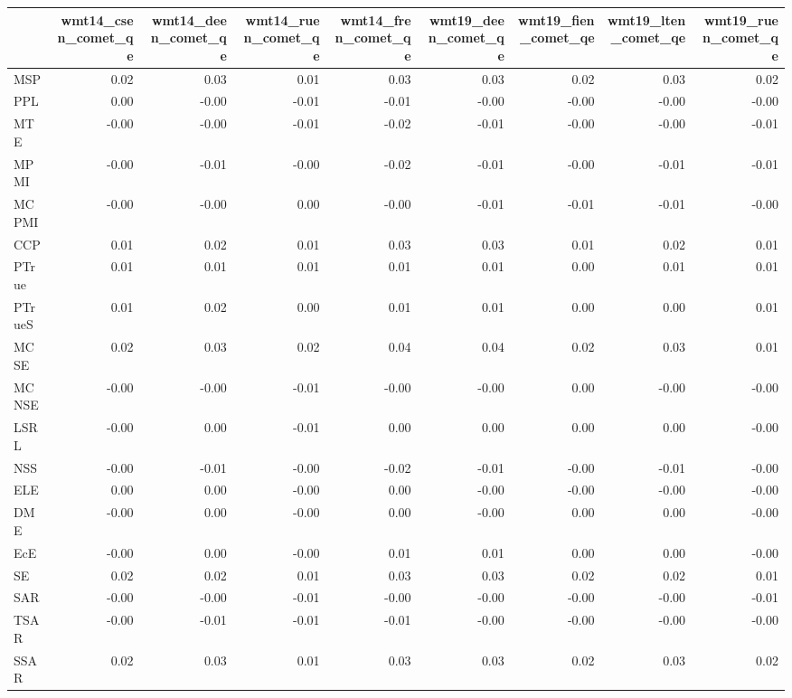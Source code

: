 \begin{tabular}{lrrrrrrrr}
\toprule
 & wmt14\_csen\_comet\_qe & wmt14\_deen\_comet\_qe & wmt14\_ruen\_comet\_qe & wmt14\_fren\_comet\_qe & wmt19\_deen\_comet\_qe & wmt19\_fien\_comet\_qe & wmt19\_lten\_comet\_qe & wmt19\_ruen\_comet\_qe \\
\midrule
MSP & 0.02 & 0.03 & 0.01 & 0.03 & 0.03 & 0.02 & 0.03 & 0.02 \\
PPL & 0.00 & -0.00 & -0.01 & -0.01 & -0.00 & -0.00 & -0.00 & -0.00 \\
MTE & -0.00 & -0.00 & -0.01 & -0.02 & -0.01 & -0.00 & -0.00 & -0.01 \\
MPMI & -0.00 & -0.01 & -0.00 & -0.02 & -0.01 & -0.00 & -0.01 & -0.01 \\
MCPMI & -0.00 & -0.00 & 0.00 & -0.00 & -0.01 & -0.01 & -0.01 & -0.00 \\
CCP & 0.01 & 0.02 & 0.01 & 0.03 & 0.03 & 0.01 & 0.02 & 0.01 \\
PTrue & 0.01 & 0.01 & 0.01 & 0.01 & 0.01 & 0.00 & 0.01 & 0.01 \\
PTrueS & 0.01 & 0.02 & 0.00 & 0.01 & 0.01 & 0.00 & 0.00 & 0.01 \\
MCSE & 0.02 & 0.03 & 0.02 & 0.04 & 0.04 & 0.02 & 0.03 & 0.01 \\
MCNSE & -0.00 & -0.00 & -0.01 & -0.00 & -0.00 & 0.00 & -0.00 & -0.00 \\
LSRL & -0.00 & 0.00 & -0.01 & 0.00 & 0.00 & 0.00 & 0.00 & -0.00 \\
NSS & -0.00 & -0.01 & -0.00 & -0.02 & -0.01 & -0.00 & -0.01 & -0.00 \\
ELE & 0.00 & 0.00 & -0.00 & 0.00 & -0.00 & -0.00 & -0.00 & -0.00 \\
DME & -0.00 & 0.00 & -0.00 & 0.00 & -0.00 & 0.00 & 0.00 & -0.00 \\
EcE & -0.00 & 0.00 & -0.00 & 0.01 & 0.01 & 0.00 & 0.00 & -0.00 \\
SE & 0.02 & 0.02 & 0.01 & 0.03 & 0.03 & 0.02 & 0.02 & 0.01 \\
SAR & -0.00 & -0.00 & -0.01 & -0.00 & -0.00 & -0.00 & -0.00 & -0.01 \\
TSAR & -0.00 & -0.01 & -0.01 & -0.01 & -0.00 & -0.00 & -0.00 & -0.00 \\
SSAR & 0.02 & 0.03 & 0.01 & 0.03 & 0.03 & 0.02 & 0.03 & 0.02 \\
\bottomrule
\end{tabular}
